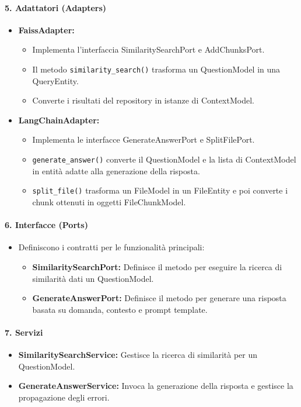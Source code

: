     \paragraph{5. Adattatori (Adapters)}
    \begin{itemize}
        \item \textbf{FaissAdapter:}
        \begin{itemize}
            \item Implementa l’interfaccia SimilaritySearchPort e AddChunksPort.
            \item Il metodo \texttt{similarity\_search()} trasforma un QuestionModel in una QueryEntity.
            \item Converte i risultati del repository in istanze di ContextModel.
        \end{itemize}
        \item \textbf{LangChainAdapter:}
        \begin{itemize}
            \item Implementa le interfacce GenerateAnswerPort e SplitFilePort.
            \item \texttt{generate\_answer()} converte il QuestionModel e la lista di ContextModel in entità adatte alla generazione della risposta.
            \item \texttt{split\_file()} trasforma un FileModel in un FileEntity e poi converte i chunk ottenuti in oggetti FileChunkModel.
        \end{itemize}
    \end{itemize}

    \paragraph{6. Interfacce (Ports)}
    \begin{itemize}
        \item Definiscono i contratti per le funzionalità principali:
        \begin{itemize}
            \item \textbf{SimilaritySearchPort:} Definisce il metodo per eseguire la ricerca di similarità dati un QuestionModel.
            \item \textbf{GenerateAnswerPort:} Definisce il metodo per generare una risposta basata su domanda, contesto e prompt template.
        \end{itemize}
    \end{itemize}

    \paragraph{7. Servizi}
    \begin{itemize}
        \item \textbf{SimilaritySearchService:} Gestisce la ricerca di similarità per un QuestionModel.
        \item \textbf{GenerateAnswerService:} Invoca la generazione della risposta e gestisce la propagazione degli errori.
    \end{itemize}

